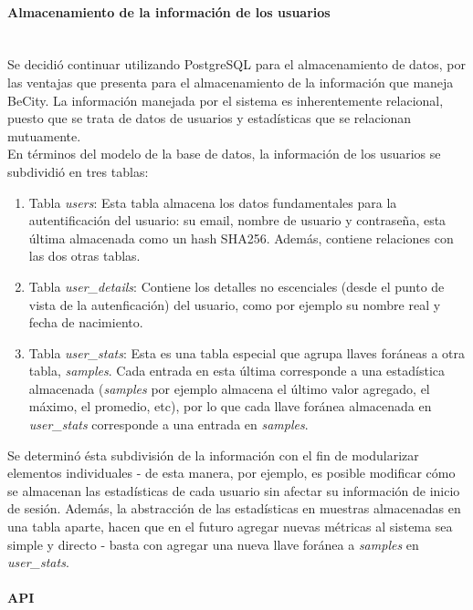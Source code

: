 \documentclass[11pt,letterpaper]{article}
\begin{document}
\paragraph{Almacenamiento de la información de los usuarios\\\\}
Se decidió continuar utilizando PostgreSQL para el almacenamiento de datos, por las ventajas que presenta para el almacenamiento de la información que maneja BeCity. La información manejada por el sistema es inherentemente relacional, puesto que se trata de datos de usuarios y estadísticas que se relacionan mutuamente.\\

En términos del modelo de la base de datos, la información de los usuarios se subdividió en tres tablas:
\begin{enumerate}
    \item Tabla \emph{users}: Esta tabla almacena los datos fundamentales para la autentificación del usuario: su email, nombre de usuario y contraseña, esta última almacenada como un hash SHA256. Además, contiene relaciones con las dos otras tablas.
    \item Tabla \emph{user\_details}: Contiene los detalles no escenciales (desde el punto de vista de la autenficación) del usuario, como por ejemplo su nombre real y fecha de nacimiento.
    \item Tabla \emph{user\_stats}: Esta es una tabla especial que agrupa llaves foráneas a otra tabla, \emph{samples}. Cada entrada en esta última corresponde a una estadística almacenada (\emph{samples} por ejemplo almacena el último valor agregado, el máximo, el promedio, etc), por lo que cada llave foránea almacenada en \emph{user\_stats} corresponde a una entrada en \emph{samples}.
\end{enumerate}

Se determinó ésta subdivisión de la información con el fin de modularizar elementos individuales - de esta manera, por ejemplo, es posible modificar cómo se almacenan las estadísticas de cada usuario sin afectar su información de inicio de sesión. Además, la abstracción de las estadísticas en muestras almacenadas en una tabla aparte, hacen que en el futuro agregar nuevas métricas al sistema sea simple y directo - basta con agregar una nueva llave foránea a \emph{samples} en \emph{user\_stats}.

\paragraph{API\\\\}
\end{document}
